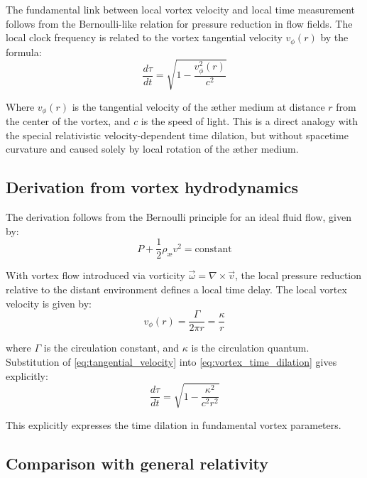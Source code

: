 The fundamental link between local vortex velocity and local time measurement follows from the Bernoulli-like relation for pressure reduction in flow fields. The local clock frequency is related to the vortex tangential velocity $v_{\phi}(r)$ by the formula:
\begin{equation}\label{eq:vortex_time_dilation}
\frac{d\tau}{dt} = \sqrt{1 - \frac{v_{\phi}^2(r)}{c^2}}
\end{equation}

Where $v_{\phi}(r)$ is the tangential velocity of the æther medium at distance $r$ from the center of the vortex, and $c$ is the speed of light. This is a direct analogy with the special relativistic velocity-dependent time dilation, but without spacetime curvature and caused solely by local rotation of the æther medium.

\subsection{Derivation from vortex hydrodynamics}

The derivation follows from the Bernoulli principle for an ideal fluid flow, given by:
\begin{equation}\label{eq:Bernoulli}
P + \frac{1}{2}\rho_\text{\ae} v^2 = \text{constant}
\end{equation}

With vortex flow introduced via vorticity $\vec{\omega} = \nabla \times \vec{v}$, the local pressure reduction relative to the distant environment defines a local time delay. The local vortex velocity is given by:
\begin{equation}\label{eq:tangential_velocity}
v_{\phi}(r) = \frac{\Gamma}{2\pi r} = \frac{\kappa}{r}
\end{equation}

where $\Gamma$ is the circulation constant, and $\kappa$ is the circulation quantum. Substitution of \eqref{eq:tangential_velocity} into \eqref{eq:vortex_time_dilation} gives explicitly:
\begin{equation}\label{eq:vortex_time_explicit}
\frac{d\tau}{dt} = \sqrt{1 - \frac{\kappa^2}{c^2 r^2}}
\end{equation}

This explicitly expresses the time dilation in fundamental vortex parameters.

\subsection{Comparison with general relativity}

